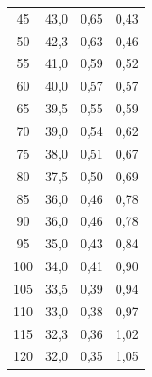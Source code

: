\documentclass{article}
\begin{document}
\begin{tabular}{cccc}
	45             & 43,0                         & 0,65                                                                 & 0,43     \\
	50             & 42,3                         & 0,63                                                                 & 0,46     \\
	55             & 41,0                         & 0,59                                                                 & 0,52     \\
	60             & 40,0                         & 0,57                                                                 & 0,57     \\
	65             & 39,5                         & 0,55                                                                 & 0,59     \\
	70             & 39,0                         & 0,54                                                                 & 0,62     \\
	75             & 38,0                         & 0,51                                                                 & 0,67     \\
	80             & 37,5                         & 0,50                                                                 & 0,69     \\
	85             & 36,0                         & 0,46                                                                 & 0,78     \\
	90             & 36,0                         & 0,46                                                                 & 0,78     \\
	95             & 35,0                         & 0,43                                                                 & 0,84     \\
	100            & 34,0                         & 0,41                                                                 & 0,90     \\
	105            & 33,5                         & 0,39                                                                 & 0,94     \\
	110            & 33,0                         & 0,38                                                                 & 0,97     \\
	115            & 32,3                         & 0,36                                                                 & 1,02     \\
	120            & 32,0                         & 0,35                                                                 & 1,05     \\

\end{tabular}
\end{document}

